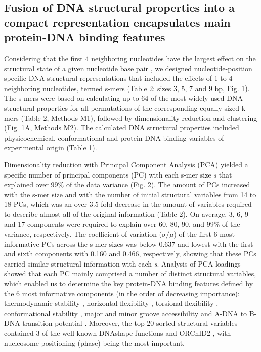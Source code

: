 \documentclass[10pt]{article}
\begin{document}
\subsection{Fusion of DNA structural properties into a compact representation encapsulates main protein-DNA binding features}
Considering that the first 4 neighboring nucleotides have the largest effect on the structural state of a given nucleotide base pair \cite{Zrimec2015-xf,Peyrard2009-as}, we designed nucleotide-position specific DNA structural representations that included the effects of 1 to 4 neighboring nucleotides, termed s-mers (Table 2: sizes 3, 5, 7 and 9 bp, Fig. 1). The s-mers were based on calculating up to 64 of the most widely used DNA structural properties for all permutations of the corresponding equally sized k-mers (Table 2, Methods M1), followed by dimensionality reduction and clustering (Fig. 1A, Methods M2). The calculated DNA structural properties included physicochemical, conformational and protein-DNA binding variables of experimental origin \cite{Zrimec2020-wx} (Table 1). 

Dimensionality reduction with Principal Component Analysis (PCA) yielded a specific number of principal components (PC) with each s-mer size \textit{s} that explained over 99\% of the data variance (Fig. 2). The amount of PCs increased with the s-mer size and with the number of initial structural variables from 14 to 18 PCs, which was an over 3.5-fold decrease in the amount of variables required to describe almost all of the original information (Table 2). On average, 3, 6, 9 and 17 components were required to explain over 60, 80, 90, and 99\% of the variance, respectively. The coefficient of variation (\(\sigma/\mu\)) of the first 6 most informative PCs across the s-mer sizes was below 0.637 and lowest with the first and sixth components with 0.160 and 0.466, respectively, showing that these PCs carried similar structural information with each \textit{s}. Analysis of PCA loadings showed that each PC mainly comprised a number of distinct structural variables, which enabled us to determine the key protein-DNA binding features defined by the 6 most informative components (in the order of decreasing importance): thermodynamic stability \cite{SantaLucia1998-hc,Protozanova2004-xc}, horizontal flexibility \cite{Olson1998-rw,Brukner1995-pt,Bolshoy1991-ux,Gorin1995-es,Karas1996-qz,Chiu2016-kb}, torsional flexibility \cite{Perez2004-sx,Kabsch1982-tv,Olson1998-rw,Karas1996-qz}, conformational stability \cite{SantaLucia1998-hc,Aida1988-iq,Perez2004-sx,Packer2000-ri,Geggier2010-mw}, major and minor groove accessibility \cite{Protozanova2004-xc,Kabsch1982-tv,Gorin1995-es,Olson1998-rw} and A-DNA to B-DNA transition potential \cite{Aida1988-iq,Perez2004-sx,Gorin1995-es,Karas1996-qz}. Moreover, the top 20 sorted structural variables contained 3 of the well known DNAshape functions \cite{Chiu2016-kb,Rohs2009-hm} and ORChID2 \cite{Bishop2011-jm}, with nucleosome positioning (phase) \cite{Satchwell1986-me} being the most important.
\end{document}

